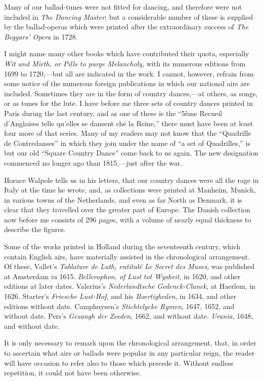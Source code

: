 
Many of our ballad-tunes were not fitted for dancing, and therefore were not 
included in \textit{The Dancing Master}; but a considerable number of these is supplied
by the ballad-operas which were printed after the extraordinary success of \textit{The
Beggars' Opera} in 1728.

I might name many other books which have contributed their quota, especially
\textit{Wit and Mirth, or Pills to purge Melancholy}, with its numerous editions from 1699
to 1720,—but all are indicated in the work. I cannot, however, refrain from
some notice of the numerous foreign publications in which our national airs are
included. Sometimes they are in the form of country dances,—at others, as
songs, or as tunes for the lute. I have before me three sets of country dances
printed in Paris during the last century, and as one of these is the “5ême Recueil
d’Anglaises telle qu’elles se dansent ché la Reine,” there must have been at least
four more of that series. Many of my readers may not know that the “Quadrille
de Contredanses” in which they join under the name of “a set of Quadrilles,”
is but our old “Square Country Dance” come back to us again. The
new designation commenced no longer ago than 1815,—just after the war.

Horace Walpole tells us in his letters, that our country dances were all the rage
in Italy at the time he wrote, and, as collections were printed at Manheim, Munich,
in various towns of the Netherlands, and even as far North as Denmark, it is
clear that they travelled over the greater part of Europe. The Danish collection
now before me consists of 296 pages, with a volume of nearly equal thickness to
describe the figures.

Some of the works printed in Holland during the seventeenth century, which
contain English airs, have materially assisted in the chronological arrangement.
Of these, Vallet’s \textit{Tablature de Luth, entitulé Le Secret des Muses}, was published
at Amsterdam iu 1615. \textit{Bellerophon, of Lust tot Wysheit}, in 1620, and other
editions at later dates. Valerius’s \textit{Nederlandtsche Gedenck-Clanck}, at Haerlem,
in 1626. Starter’s \textit{Friesche Lust-Hof}, and his \textit{Boertigheden}, in 1634, and other
editions without date. Camphuysen’s \textit{Stichtelycke Rymen}, 1647, 1652, and
without date. Pers’s \textit{Gesangh der Zeeden}, 1662, and without date. \textit{Urania},
1648, and without date.

It is only necessary to remark upon the chronological arrangement, that, in
order to ascertain what airs or ballads were popular in any particular reign, the
reader will have occasion to refer also to those which precede it. Without endless
repetition, it could not have been otherwise.


